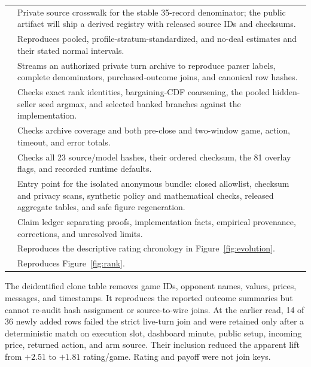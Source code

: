 \begin{table}[h]
\begin{tabularx}{\linewidth}{@{}p{4.1cm}Y@{}}
 & Private source crosswalk for the stable 35-record denominator; the public artifact will ship a derived registry with released source IDs and checksums. \\
 & Reproduces pooled, profile-stratum-standardized, and no-deal estimates and their stated normal intervals. \\
 & Streams an authorized private turn archive to reproduce parser labels, complete denominators, purchased-outcome joins, and canonical row hashes. \\
 & Checks exact rank identities, bargaining-CDF coarsening, the pooled hidden-seller seed argmax, and selected banked branches against the implementation. \\
 & Checks archive coverage and both pre-close and two-window game, action, timeout, and error totals. \\
 & Checks all 23 source/model hashes, their ordered checksum, the 81 overlay flags, and recorded runtime defaults. \\
 & Entry point for the isolated anonymous bundle: closed allowlist, checksum and privacy scans, synthetic policy and mathematical checks, released aggregate tables, and safe figure regeneration. \\
 & Claim ledger separating proofs, implementation facts, empirical provenance, corrections, and unresolved limits. \\
 & Reproduces the descriptive rating chronology in Figure~\ref{fig:evolution}. \\
 & Reproduces Figure~\ref{fig:rank}. \\
\bottomrule
\end{tabularx}
\end{table}

The deidentified clone table removes game IDs, opponent names, values, prices,
messages, and timestamps. It reproduces the reported outcome summaries but
cannot re-audit hash assignment or source-to-wire joins. At the earlier read,
14 of 36 newly added rows failed the strict live-turn join and were retained
only after a deterministic match on execution slot, dashboard minute, public setup,
incoming price, returned action, and arm source. Their inclusion reduced the
apparent lift from $+2.51$ to $+1.81$ rating/game. Rating and payoff were not
join keys.

